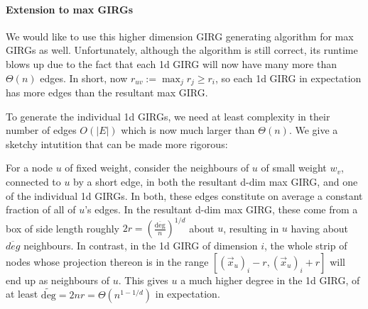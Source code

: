 \paragraph{Extension to max GIRGs} We would like to use this higher dimension GIRG generating algorithm for max GIRGs as well. Unfortunately, although the algorithm is still correct, its runtime blows up due to the fact that each 1d GIRG will now have many more than $\Theta(n)$ edges. In short, now $r_{uv} := \max_j r_j \geq r_i$, so each 1d GIRG in expectation has more edges than the resultant max GIRG. 


To generate the individual 1d GIRGs, we need at least complexity in their number of edges $O(|E|)$ which is now much larger than $\Theta(n)$. We give a sketchy intutition that can be made more rigorous:

For a node $u$ of fixed weight, consider the neighbours of $u$ of small weight $w_v$, connected to $u$ by a short edge, in both the resultant d-dim max GIRG, and one of the individual 1d GIRGs.
In both, these edges constitute on average a constant fraction of all of $u$'s edges.
In the resultant d-dim max GIRG, these come from a box of side length roughly $2r = \left ( \frac{\overline{\text{deg}}}{ n} \right )^{1/d}$ about $u$, resulting in $u$ having about $\overline{deg}$ neighbours.
In contrast, in the 1d GIRG of dimension $i$, the whole strip of nodes whose projection thereon is in the range $[(\vec{x}_u)_i - r, (\vec{x}_u)_i +r]$ will end up as neighbours of $u$.
This gives $u$ a much higher degree in the 1d GIRG, of at least $\widetilde{\text{deg}} = 2nr = \Theta(n^{1 - 1/d})$ in expectation.




